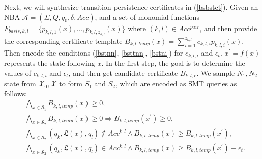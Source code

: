 \documentclass[acmlarge]{acmart}
\begin{document}
Next, we will synthesize transition persistence certificates in (\ref{bsbstct}). Given an NBA $\mathcal{A}=(\Sigma, Q, q_0, \delta, Acc)$, and a set of monomial functions $F_{basis, k, l} = \{p_{k, l, 1}(x), \dots, p_{k, l, z_{k,l}}(x)\}$ where $(k, l) \in Acc^{pair}$, and then provide the corresponding certificate template $B_{k, l, temp}(x) = \sum_{i=1}^{z_{k,l}} c_{k,l,i}p_{k,l,i}(x)$. Then encode the conditions (\ref{bstnn}, \ref{bsttnn}, \ref{bstni}) for $c_{k, l, i}$ and $\epsilon_t$. $x^{\prime} = f(x)$ represents the state following $x$. In the first step, the goal is to determine the values of $c_{k, l, i}$ and $\epsilon_t$, and then get candidate certificate $B_{k, l, c}$. We sample $N_1, N_2$ state from $\mathcal{X}_0, \mathcal{X}$ to form $S_1$ and $S_2$, which are encoded as SMT queries as follows:
\begin{align}
&\bigwedge_{x \in \mathcal{S}_1} B_{k, l, temp}(x) \geq 0, \label{smtbstpt0}\\
&\bigwedge_{x \in \mathcal{S}_2} B_{k, l, temp}(x) \geq 0 \Rightarrow B_{k, l, temp}(x^{\prime}) \geq 0, \label{smtbstpt1}\\
&\bigwedge_{x \in \mathcal{S}_2} (q_k, \mathfrak{L}(x), q_l) \not\in Acc^{k, l} \land B_{k, l, temp}(x) \geq B_{k, l, temp}(x^{\prime}), \label{smtbstpt2}\\
&\bigwedge_{x \in \mathcal{S}_2} (q_k, \mathfrak{L}(x), q_l) \in Acc^{k, l} \land B_{k, l, temp}(x) \geq B_{k, l, temp}(x^{\prime}) + \epsilon_t. \label{smtbstpt3}
\end{align}
\end{document}
